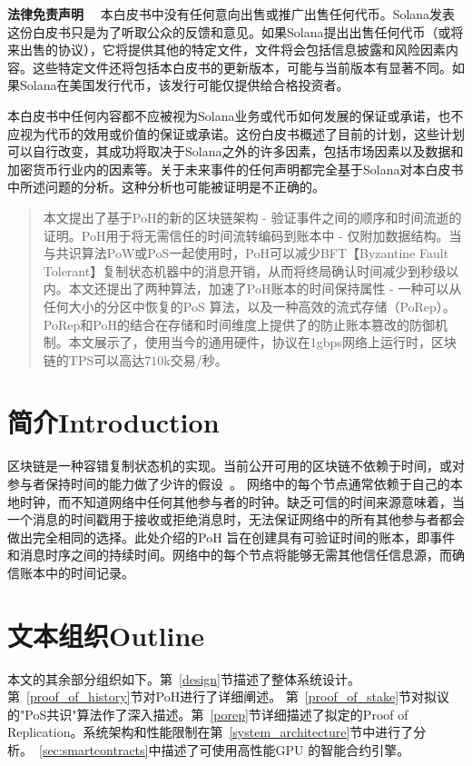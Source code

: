 \documentclass[12pt, uft8]{ctexart}
\begin{document}
\maketitle

\textbf{\footnotesize 法律免责声明}\scriptsize
~~本白皮书中没有任何意向出售或推广出售任何代币。Solana发表这份白皮书只是为了听取公众的反馈和意见。如果Solana提出出售任何代币（或将来出售的协议），它将提供其他的特定文件，文件将会包括信息披露和风险因素内容。这些特定文件还将包括本白皮书的更新版本，可能与当前版本有显著不同。如果Solana在美国发行代币，该发行可能仅提供给合格投资者。

本白皮书中任何内容都不应被视为Solana业务或代币如何发展的保证或承诺，也不应视为代币的效用或价值的保证或承诺。这份白皮书概述了目前的计划，这些计划可以自行改变，其成功将取决于Solana之外的许多因素，包括市场因素以及数据和加密货币行业内的因素等。关于未来事件的任何声明都完全基于Solana对本白皮书中所述问题的分析。这种分析也可能被证明是不正确的。

\begin{abstract}
本文提出了基于PoH的新的区块链架构 - 验证事件之间的顺序和时间流逝的证明。PoH用于将无需信任的时间流转编码到账本中 - 仅附加数据结构。当与共识算法PoW或PoS一起使用时，PoH可以减少BFT【Byzantine Fault Tolerant】复制状态机器中的消息开销，从而将终局确认时间减少到秒级以内。本文还提出了两种算法，加速了PoH账本的时间保持属性 - 一种可以从任何大小的分区中恢复的PoS 算法，以及一种高效的流式存储（PoRep）。PoRep和PoH的结合在存储和时间维度上提供了的防止账本篡改的防御机制。本文展示了，使用当今的通用硬件，协议在1gbps网络上运行时，区块链的TPS可以高达$710$k交易/秒。



\end{abstract}


\section{简介Introduction}\normalsize
区块链是一种容错复制状态机的实现。当前公开可用的区块链不依赖于时间，或对参与者保持时间的能力做了少许的假设~\cite{tendermint,hashgraph}。 网络中的每个节点通常依赖于自己的本地时钟，而不知道网络中任何其他参与者的时钟。缺乏可信的时间来源意味着，当一个消息的时间戳用于接收或拒绝消息时，无法保证网络中的所有其他参与者都会做出完全相同的选择。此处介绍的PoH 旨在创建具有可验证时间的账本，即事件和消息时序之间的持续时间。网络中的每个节点将能够无需其他信任信息源，而确信账本中的时间记录。

\section{文本组织Outline}
本文的其余部分组织如下。第~\ref{design}节描述了整体系统设计。第~\ref{proof_of_history}节对PoH进行了详细阐述。 第~\ref{proof_of_stake}节对拟议的"PoS共识"算法作了深入描述。第~\ref{porep}节详细描述了拟定的Proof of Replication。系统架构和性能限制在第~\ref{system_architecture}节中进行了分析。~\ref{sec:smartcontracts}中描述了可使用高性能GPU 的智能合约引擎。
\end{document}
